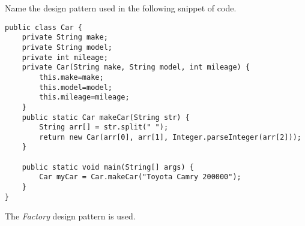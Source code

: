 Name the design pattern used in the following snippet of code.
\begin{lstlisting}
public class Car {
	private String make;
	private String model;
	private int mileage;
	private Car(String make, String model, int mileage) {
		this.make=make;
		this.model=model;
		this.mileage=mileage;
	}
	public static Car makeCar(String str) {
		String arr[] = str.split(" ");
		return new Car(arr[0], arr[1], Integer.parseInteger(arr[2]));
	}

	public static void main(String[] args) {
		Car myCar = Car.makeCar("Toyota Camry 200000");
	}
}
\end{lstlisting}

\begin{answer}
The \emph{Factory} design pattern is used.
\vspace{.1in}
\end{answer}
